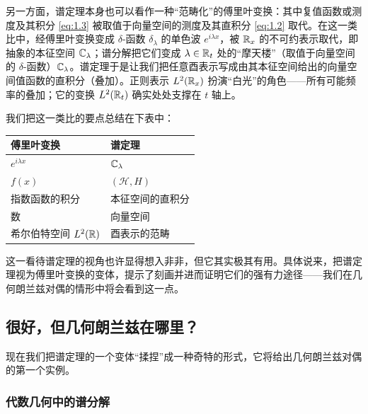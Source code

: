 另一方面，谱定理本身也可以看作一种“范畴化”的傅里叶变换：其中复值函数或测度及其积分 \eqref{eq:1.3} 被取值于向量空间的测度及其直积分 \eqref{eq:1.2} 取代。在这一类比中，经傅里叶变换变成 $\delta$-函数 $\delta_{\lambda}$ 的单色波 $e^{i\lambda x}$，被 $\mathbb{R}_{x}$ 的不可约表示取代，即抽象的本征空间 $\mathbb{C}_{\lambda}$；谱分解把它们变成 $\lambda\in\mathbb{R}_{t}$ 处的“摩天楼”（取值于向量空间的 $\delta$-函数）$\mathbb{C}_{\lambda}$。谱定理于是让我们把任意酉表示写成由其本征空间给出的向量空间值函数的直积分（叠加）。正则表示 $L^{2}(\mathbb{R}_{x})$ 扮演“白光”的角色——所有可能频率的叠加；它的变换 $L^{2}(\mathbb{R}_{t})$ 确实处处支撑在 $t$ 轴上。

我们把这一类比的要点总结在下表中：

\begin{center}
\renewcommand{\arraystretch}{1.25}
\begin{tabular}{ll}
\toprule
傅里叶变换 & 谱定理\\
\midrule
$e^{i\lambda x}$ & $\mathbb{C}_{\lambda}$\\
$f(x)$ & $(\mathcal{H},H)$\\
指数函数的积分 & 本征空间的直积分\\
数 & 向量空间\\
希尔伯特空间 $L^{2}(\mathbb{R})$ & 酉表示的范畴\\
\bottomrule
\end{tabular}
\end{center}

这一看待谱定理的视角也许显得想入非非，但它其实极其有用。具体说来，把谱定理视为傅里叶变换的变体，提示了刻画并进而证明它们的强有力途径——我们在几何朗兰兹对偶的情形中将会看到这一点。

\subsection{很好，但几何朗兰兹在哪里？}\label{sec:1.3}

现在我们把谱定理的一个变体“揉捏”成一种奇特的形式，它将给出几何朗兰兹对偶的第一个实例。

\subsubsection{代数几何中的谱分解}\label{sec:1.3.1}

